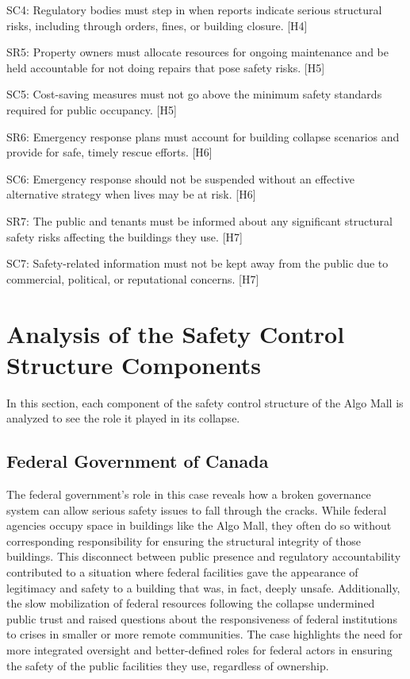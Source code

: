\documentclass[12pt]{article}
\begin{document}
SC4: Regulatory bodies must step in when reports indicate serious structural risks, including through orders, fines, or building closure. [H4]

SR5: Property owners must allocate resources for ongoing maintenance and be held accountable for not doing repairs that pose safety risks. [H5]

SC5: Cost-saving measures must not go above the minimum safety standards required for public occupancy. [H5]

SR6: Emergency response plans must account for building collapse scenarios and provide for safe, timely rescue efforts. [H6]

SC6: Emergency response should not be suspended without an effective alternative strategy when lives may be at risk. [H6]

SR7: The public and tenants must be informed about any significant structural safety risks affecting the buildings they use. [H7]

SC7: Safety-related information must not be kept away from the public due to commercial, political, or reputational concerns. [H7]

\section{Analysis of the Safety Control Structure Components}
In this section, each component of the safety control structure of the Algo Mall is analyzed to see the role it played in its collapse.

\subsection{Federal Government of Canada}
The federal government’s role in this case reveals how a broken governance system can allow serious safety issues to fall through the cracks. While federal agencies occupy space in buildings like the Algo Mall, they often do so without corresponding responsibility for ensuring the structural integrity of those buildings. This disconnect between public presence and regulatory accountability contributed to a situation where federal facilities gave the appearance of legitimacy and safety to a building that was, in fact, deeply unsafe. Additionally, the slow mobilization of federal resources following the collapse undermined public trust and raised questions about the responsiveness of federal institutions to crises in smaller or more remote communities. The case highlights the need for more integrated oversight and better-defined roles for federal actors in ensuring the safety of the public facilities they use, regardless of ownership.
\end{document}
